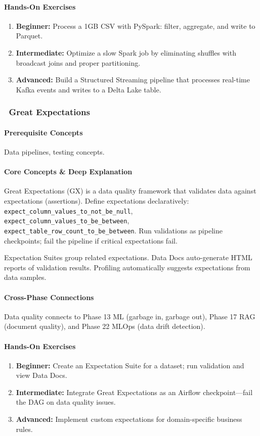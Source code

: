 \documentclass[11pt, a4paper, oneside]{report}
\newcommand{\mustmaster}[1]{\subsubsection{\texorpdfstring{\fcolorbox{blue!40!black}{blue!8}{\footnotesize\bfseries\color{blue!40!black} MUST MASTER}~#1}{#1}}}
\begin{document}
\paragraph{Hands-On Exercises}
\begin{enumerate}[leftmargin=*]
\item \textbf{Beginner:} Process a 1GB CSV with PySpark: filter, aggregate, and write to Parquet.
\item \textbf{Intermediate:} Optimize a slow Spark job by eliminating shuffles with broadcast joins and proper partitioning.
\item \textbf{Advanced:} Build a Structured Streaming pipeline that processes real-time Kafka events and writes to a Delta Lake table.
\end{enumerate}

\mustmaster{Great Expectations}

\paragraph{Prerequisite Concepts} Data pipelines, testing concepts.

\paragraph{Core Concepts \& Deep Explanation} Great Expectations (GX) is a data quality framework that validates data against expectations (assertions). Define expectations declaratively: \texttt{expect\_column\_values\_to\_not\_be\_null}, \texttt{expect\_column\_values\_to\_be\_between}, \texttt{expect\_table\_row\_count\_to\_be\_between}. Run validations as pipeline checkpoints; fail the pipeline if critical expectations fail.

Expectation Suites group related expectations. Data Docs auto-generate HTML reports of validation results. Profiling automatically suggests expectations from data samples.

\paragraph{Cross-Phase Connections} Data quality connects to Phase 13 ML (garbage in, garbage out), Phase 17 RAG (document quality), and Phase 22 MLOps (data drift detection).

\paragraph{Hands-On Exercises}
\begin{enumerate}[leftmargin=*]
\item \textbf{Beginner:} Create an Expectation Suite for a dataset; run validation and view Data Docs.
\item \textbf{Intermediate:} Integrate Great Expectations as an Airflow checkpoint---fail the DAG on data quality issues.
\item \textbf{Advanced:} Implement custom expectations for domain-specific business rules.
\end{enumerate}
\end{document}
